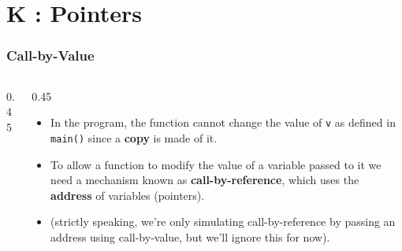 \section{K : Pointers}
\label{chap:pointers}


\begin{frame}[fragile]
\frametitle{Call-by-Value}
\begin{columns}[T]

\begin{column}{0.45\textwidth}

\pause
{}
\end{column}

\pause
\begin{column}{0.45\textwidth}
\begin{itemize}[<+->]
\item In the program, the function cannot change
the value of \verb^v^ as defined in \verb^main()^ since
a {\bf copy} is made of it.
\item To allow a function to modify the value of a variable
passed to it we need a mechanism known as
{\bf call-by-reference}, which uses the {\bf address}
of variables (pointers). 
\item {\small(strictly speaking, we're only simulating call-by-reference
by passing an address using call-by-value, but we'll ignore this for now).}
\end{itemize}
\end{column}

\end{columns}
\end{frame}



